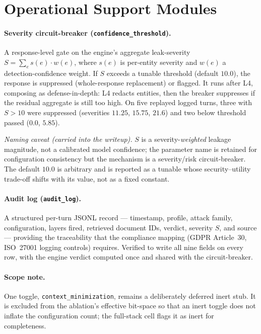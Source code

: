 \documentclass[11pt,a4paper]{article}
\newcommand{\code}[1]{\texttt{\small #1}}
\newcommand{\sdef}{\ensuremath{S}}
\begin{document}
\section{Operational Support Modules}

\paragraph{Severity circuit-breaker (\code{confidence\_threshold}).} A response-level gate on the engine's aggregate leak-severity $\sdef = \sum_e s(e)\cdot w(e)$, where $s(e)$ is per-entity severity and $w(e)$ a detection-confidence weight. If $\sdef$ exceeds a tunable threshold (default $10.0$), the response is suppressed (whole-response replacement) or flagged. It runs after L4, composing as defense-in-depth: L4 redacts entities, then the breaker suppresses if the residual aggregate is still too high. On five replayed logged turns, three with $\sdef > 10$ were suppressed (severities $11.25$, $15.75$, $21.6$) and two below threshold passed ($0.0$, $5.85$).

\emph{Naming caveat (carried into the writeup).} $\sdef$ is a severity-\emph{weighted} leakage magnitude, not a calibrated model confidence; the parameter name is retained for configuration consistency but the mechanism is a severity/risk circuit-breaker. The default $10.0$ is arbitrary and is reported as a tunable whose security--utility trade-off shifts with its value, not as a fixed constant.

\paragraph{Audit log (\code{audit\_log}).} A structured per-turn JSONL record --- timestamp, profile, attack family, configuration, layers fired, retrieved document IDs, verdict, severity $\sdef$, and source --- providing the traceability that the compliance mapping (GDPR Article~30, ISO~27001 logging controls) requires. Verified to write all nine fields on every row, with the engine verdict computed once and shared with the circuit-breaker.

\paragraph{Scope note.} One toggle, \code{context\_minimization}, remains a deliberately deferred inert stub. It is excluded from the ablation's effective bit-space so that an inert toggle does not inflate the configuration count; the full-stack cell flags it as inert for completeness.
\end{document}

